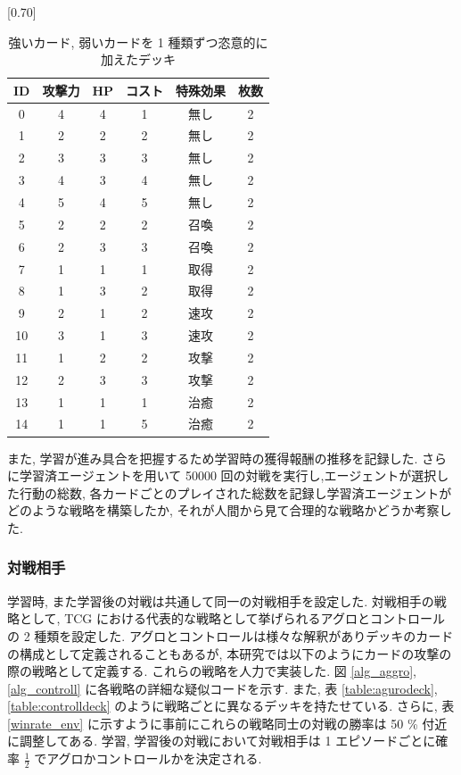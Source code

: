 \documentclass[12pt]{jarticle}
\begin{document}
\begin{table}[ht]
  \centering
  \caption{強いカード, 弱いカードを 1 種類ずつ恣意的に加えたデッキ}
  \label{table:OPdeck}
  \vspace{-0.3cm}
  \scalebox{0.70}[0.70]{
    \begin{tabular}{|c|c|c|c|c|c|}
      \hline
      ID & 攻撃力 & HP & コスト & 特殊効果 & 枚数 \\ \hline
      0 & 4 & 4 & 1 & 無し & 2 \\ \hline
      1 & 2 & 2 & 2 & 無し & 2 \\ \hline
      2 & 3 & 3 & 3 & 無し & 2 \\ \hline
      3 & 4 & 3 & 4 & 無し & 2 \\ \hline
      4 & 5 & 4 & 5 & 無し & 2 \\ \hline
      5 & 2 & 2 & 2 & 召喚 & 2 \\ \hline
      6 & 2 & 3 & 3 & 召喚 & 2 \\ \hline
      7 & 1 & 1 & 1 & 取得 & 2 \\ \hline
      8 & 1 & 3 & 2 & 取得 & 2 \\ \hline
      9 & 2 & 1 & 2 & 速攻 & 2 \\ \hline
      10 & 3 & 1 & 3 & 速攻 & 2 \\ \hline
      11 & 1 & 2 & 2 & 攻撃 & 2 \\ \hline
      12 & 2 & 3 & 3 & 攻撃 & 2 \\ \hline
      13 & 1 & 1 & 1 & 治癒 & 2 \\ \hline
      14 & 1 & 1 & 5 & 治癒 & 2 \\ \hline
      \end{tabular}
  }
  
  \end{table}
また, 学習が進み具合を把握するため学習時の獲得報酬の推移を記録した.
さらに学習済エージェントを用いて 50000 回の対戦を実行し,エージェントが選択した行動の総数, 各カードごとのプレイされた総数を記録し学習済エージェントがどのような戦略を構築したか, それが人間から見て合理的な戦略かどうか考察した.

\subsubsection{対戦相手}
学習時, また学習後の対戦は共通して同一の対戦相手を設定した. 
対戦相手の戦略として, TCG における代表的な戦略として挙げられるアグロとコントロールの 2 種類を設定した. アグロとコントロールは様々な解釈がありデッキのカードの構成として定義されることもあるが, 本研究では以下のようにカードの攻撃の際の戦略として定義する. これらの戦略を人力で実装した.  図 \ref{alg_aggro}, \ref{alg_controll} に各戦略の詳細な疑似コードを示す. また, 表 \ref{table:agurodeck}, \ref{table:controlldeck} のように戦略ごとに異なるデッキを持たせている. さらに, 表 \ref{winrate_env} に示すように事前にこれらの戦略同士の対戦の勝率は 50 \% 付近に調整してある. 学習, 学習後の対戦において対戦相手は 1 エピソードごとに確率 $\frac{1}{2}$ でアグロかコントロールかを決定される.
\end{document}
